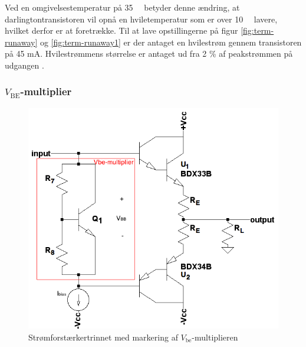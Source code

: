 Ved en omgivelsestemperatur på 35~\celsius~ betyder denne ændring, at darlingtontransistoren vil opnå en hviletemperatur som er over 10~\celsius~ lavere, hvilket derfor er at foretrække. Til at lave opstillingerne på figur \ref{fig:term-runaway} og \ref{fig:term-runaway1} er der antaget en hvilestrøm gennem transistoren på 45 mA. Hvilestrømmens størrelse er antaget ud fra 2 \% af peakstrømmen på udgangen \cite{sedra-smith-10}.


\subsubsection*{$V_\mathrm{BE}$-multiplier}

\begin{figure}[h]
\centering
\includegraphics[scale=.4]{teknisk/effektforstaerker/vbemultiplieropbygning.png}
\caption{Strømforstærkertrinnet med markering af $V_\mathrm{be}$-multiplieren}
\label{fig:vbemulti}
\end{figure}


